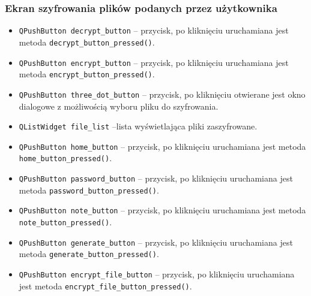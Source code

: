 \documentclass[a4paper]{article}
\newcommand{\prog}{\texttt}
\begin{document}
\subsubsection{Ekran szyfrowania plików podanych przez użytkownika}
\begin{itemize}
    \item \prog{QPushButton decrypt\_button} -- przycisk, po kliknięciu uruchamiana jest metoda \prog{decrypt\_button\_pressed()}.
    \item \prog{QPushButton encrypt\_button} -- przycisk, po kliknięciu uruchamiana jest metoda \prog{encrypt\_button\_pressed()}.
    \item \prog{QPushButton three\_dot\_button} -- przycisk, po kliknięciu otwierane jest okno dialogowe z możliwością wyboru pliku do szyfrowania.
    \item \prog{QListWidget file\_list} --lista wyświetlająca pliki zaszyfrowane.
    \item \prog{QPushButton home\_button} -- przycisk, po kliknięciu uruchamiana jest metoda \prog{home\_button\_pressed()}.
    \item \prog{QPushButton password\_button} -- przycisk, po kliknięciu uruchamiana jest metoda \prog{password\_button\_pressed()}.
    \item \prog{QPushButton note\_button} -- przycisk, po kliknięciu uruchamiana jest metoda \prog{note\_button\_pressed()}.
    \item \prog{QPushButton generate\_button} -- przycisk, po kliknięciu uruchamiana jest metoda \prog{generate\_button\_pressed()}.
    \item \prog{QPushButton encrypt\_file\_button} -- przycisk, po kliknięciu uruchamiana jest metoda \prog{encrypt\_file\_button\_pressed()}.
\end{itemize}

\newpage
\end{document}
